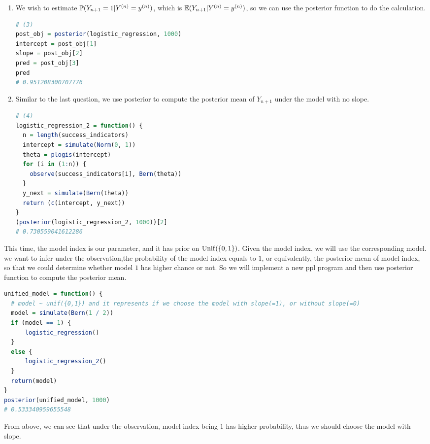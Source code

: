 \documentclass{article}
\begin{document}
\begin{enumerate}
\item 
We wish to estimate $\P(Y_{n+1} = 1 | Y^{(n)} = y^{(n)})$, which is $\E (Y_{n+1} | Y^{(n)} = y^{(n)})$, so we can use the posterior function to do the calculation.
\begin{lstlisting}[language=R]
# (3)
post_obj = posterior(logistic_regression, 1000)
intercept = post_obj[1]
slope = post_obj[2]
pred = post_obj[3]
pred
# 0.951208300707776
\end{lstlisting}



\item Similar to the last question, we use posterior to compute the posterior mean of $Y_{n+1}$ under the model with no slope. 
\begin{lstlisting}[language=R]
# (4)
logistic_regression_2 = function() {
  n = length(success_indicators)
  intercept = simulate(Norm(0, 1))
  theta = plogis(intercept)
  for (i in (1:n)) {
    observe(success_indicators[i], Bern(theta))
  }
  y_next = simulate(Bern(theta))
  return (c(intercept, y_next))
}
(posterior(logistic_regression_2, 1000))[2]
# 0.730559041612286
\end{lstlisting}





\end{enumerate}


This time, the model index is our parameter, and it has prior on $\Unif(\{0,1\})$. Given the model index, we will use the corresponding model. we want to infer under the observation,the probability of the model index equals to $1$, or equivalently, the posterior mean of model index, so that we could determine whether model $1$ has higher chance or not. So we will implement a new ppl program and then use posterior function to compute the posterior mean.
\begin{lstlisting}[language=R]
unified_model = function() {
  # model ~ unif({0,1}) and it represents if we choose the model with slope(=1), or without slope(=0)
  model = simulate(Bern(1 / 2))
  if (model == 1) {
      logistic_regression()
  }
  else {
      logistic_regression_2()
  }
  return(model)
}
posterior(unified_model, 1000)
# 0.533340959655548
\end{lstlisting}
From above, we can see that under the observation, model index being $1$ has higher probability, thus we should choose the model with slope.










 
\end{document}
